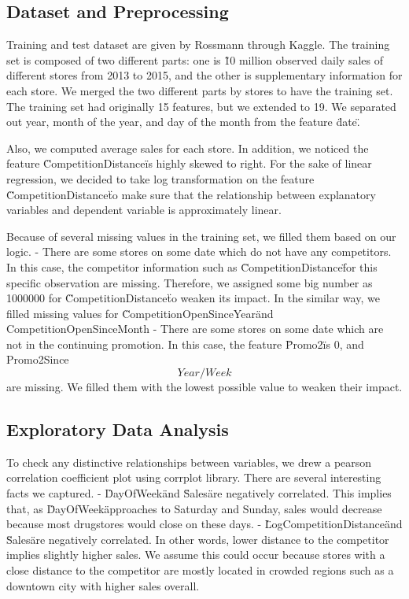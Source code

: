 \documentclass[letterpaper,twocolumn,10pt]{article}
\begin{document}
\subsection{Dataset and Preprocessing}
Training and test dataset are given by Rossmann through Kaggle. The training set is composed of two different parts: one is \~10 million observed daily sales of different stores from 2013 to 2015, and the other is supplementary information for each store. We merged the two different parts by stores to have the training set. The training set had originally 15 features, but we extended to 19. We separated out year, month of the year, and day of the month from the feature \"date\". 


Also, we computed average sales for each store. In addition, we noticed the feature \"CompetitionDistance\" is highly skewed to right. For the sake of linear regression, we decided to take log transformation on the feature \"CompetitionDistance\" to make sure that the relationship between explanatory variables and dependent variable is approximately linear.


Because of several missing values in the training set, we filled them based on our logic.
- There are some stores on some date which do not have any competitors. In this case, the competitor information such as \"CompetitionDistance\" for this specific observation are missing. Therefore, we assigned some big number as 1000000 for \"CompetitionDistance\" to weaken its impact. In the similar way, we filled missing values for \"CompetitionOpenSinceYear\" and CompetitionOpenSinceMonth
- There are some stores on some date which are not in the continuing promotion. In this case, the feature \"Promo2\" is 0, and Promo2Since\[Year/Week\] are missing. We filled them with the lowest possible value to weaken their impact. 


\subsection{Exploratory Data Analysis}
To check any distinctive relationships between variables, we drew a pearson correlation coefficient plot using corrplot library. There are several interesting facts we captured. 
- \"DayOfWeek\" and \"Sales\" are negatively correlated. This implies that, as \"DayOfWeek\" approaches to Saturday and Sunday, sales would decrease because most drugstores would close on these days.
- \"LogCompetitionDistance\" and \"Sales\" are negatively correlated. In other words, lower distance to the competitor implies slightly higher sales. We assume this could occur because stores with a close distance to the competitor are mostly located in crowded regions such as a downtown city with higher sales overall.
\end{document}
